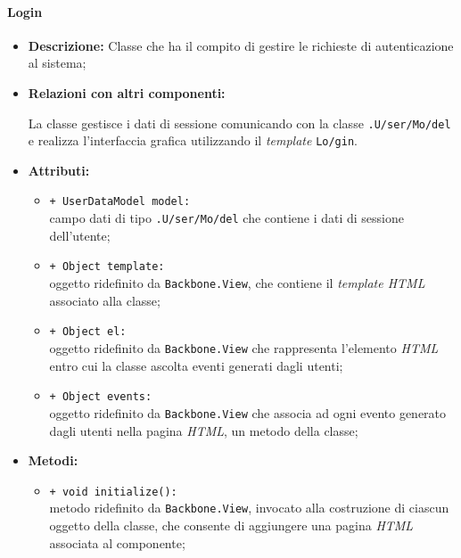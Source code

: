 \paragraph{Login}
\label{login}
\begin{flushleft}
\begin{itemize}
\item \textbf{Descrizione:} Classe che ha il compito di gestire le richieste di autenticazione al sistema;
\item \textbf{Relazioni con altri componenti:}
\begin{sloppypar}
La classe gestisce i dati di sessione comunicando con la classe \texttt{\model{}.U\fshyp{}ser\fshyp{}Mo\fshyp{}del} e realizza l'interfaccia grafica utilizzando il \textit{template} \texttt{\view{}Lo\fshyp{}gin}.
\end{sloppypar}
\item \textbf{Attributi:}
\begin{sloppypar}
\begin{itemize}
\item \texttt{+ UserDataModel model:}\\ campo dati di tipo \texttt{\model{}.U\fshyp{}ser\fshyp{}Mo\fshyp{}del} che contiene i dati di sessione dell'utente;
\item \texttt{+ Object template:}\\ oggetto ridefinito da \texttt{Backbone.View}, che contiene il \textit{template HTML} associato alla classe;
\item \texttt{+ Object el:}\\ oggetto ridefinito da \texttt{Backbone.View} che rappresenta l'elemento \textit{HTML} entro cui la classe ascolta eventi generati dagli utenti;
\item \texttt{+ Object events:}\\ oggetto ridefinito da \texttt{Backbone.View} che associa ad ogni evento generato dagli utenti nella pagina \textit{HTML}, un metodo della classe;
\end{itemize}
\end{sloppypar}
\item \textbf{Metodi:}
\begin{sloppypar}
\begin{itemize}
\item \texttt{+ void initialize():}\\ metodo ridefinito da \texttt{Backbone.View}, invocato alla costruzione di ciascun oggetto della classe, che consente di aggiungere una pagina \textit{HTML} associata al componente;

\end{itemize}
\end{sloppypar}
\end{itemize}
\end{flushleft}
